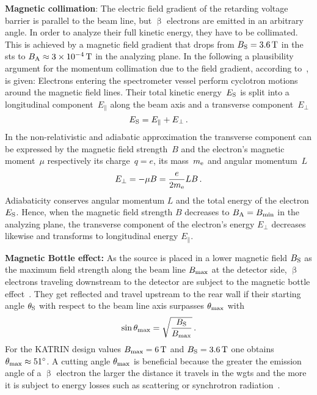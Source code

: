 {\par \textbf{Magnetic collimation}: 
The electric field gradient of the retarding voltage barrier is parallel to the beam line, but $\upbeta$ electrons are emitted in an arbitrary angle. In order to analyze their full kinetic energy, they have to be collimated. This is achieved by a magnetic field gradient that drops from $B_\mathrm{S}=\SI{3.6}{T}$ in the \gls{sts} to $B_\mathrm{A}\approx\SI{3e-4}{T}$ in the analyzing plane. In the following a plausibility argument for the momentum collimation due to the field gradient, according to~\cite{zuber2011neutrino}, is given: Electrons entering the spectrometer vessel perform cyclotron motions around the magnetic field lines. Their total kinetic energy~$E_\mathrm{S}$ is split into a longitudinal component~$E_\parallel$ along the beam axis and a transverse component~$E_\bot$
\begin{equation}
\label{eq:totalKinElecEnergy}
E_\mathrm{S} = E_\parallel + E_\bot \text{\,.}
\end{equation}
In the non-relativistic and adiabatic approximation the transverse component can be expressed by the magnetic field strength~$B$ and the electron's magnetic moment~$\mu$ respectively its charge~$q=e$, its mass~$m_{\mathrm{e}}$ and angular momentum~$L$~\cite{zuber2011neutrino}
\begin{equation}
E_\bot = - \mu B = \frac{e}{2 m_{\mathrm{e}}}LB \text{\,.}
\end{equation}
Adiabaticity conserves angular momentum $L$ and the total energy of the electron $E_\mathrm{S}$. Hence, when the magnetic field strength $B$ decreases to $B_\mathrm{A}=B_\mathrm{min}$ in the analyzing plane, the transverse component of the electron's energy $E_\bot$ decreases likewise and transforms to longitudinal energy $E_\parallel$.}

{\par \textbf{Magnetic Bottle effect:}
As the source is placed in a lower magnetic field $B_\mathrm{S}$ as the maximum field strength along the beam line $B_\mathrm{max}$ at the detector side, $\upbeta$ electrons traveling downstream to the detector are subject to the magnetic bottle effect~\cite{Angrik:2005ep}. They get reflected and travel upstream to the rear wall if their starting angle $\theta_\mathrm{S}$ with respect to the beam line axis surpasses $\theta_\mathrm{max}$ with
\begin{equation}
\label{eq:thetaMax}
\sin\theta_\mathrm{max} = \sqrt{\frac{B_\mathrm{S}}{B_\mathrm{max}}} 
\text{\,.}
\end{equation}
For the KATRIN design values $B_\mathrm{max}=\SI{6}{T}$ and $B_\mathrm{S}=\SI{3.6}{T}$ one obtains $\theta_\mathrm{max}\approx\SI{51}{\degree}$.
A cutting angle $\theta_\mathrm{max}$ is beneficial because the greater the emission angle of a $\upbeta$ electron the larger the distance it travels in the \gls{wgts} and the more it is subject to energy losses such as scattering or synchrotron radiation~\cite{Angrik:2005ep}.}

